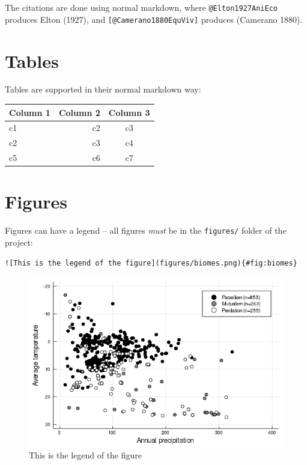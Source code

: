 \documentclass[12pt]{article}
\makeatletter
\def\maxwidth{\ifdim\Gin@nat@width>\linewidth\linewidth
\else\Gin@nat@width\fi}
\let\Oldincludegraphics\includegraphics
\renewcommand{\includegraphics}[1]{\Oldincludegraphics[width=\maxwidth]{#1}}
\makeatother
\begin{document}
The citations are done using normal markdown, where
\texttt{@Elton1927AniEco} produces Elton (1927), and
\texttt{{[}@Camerano1880EquViv{]}} produces (Camerano 1880).

\hypertarget{tables}{%
\section{Tables}\label{tables}}

Tables are supported in their normal markdown way:

\begin{longtable}[]{@{}lrc@{}}
\toprule
Column 1 & Column 2 & Column 3\tabularnewline
\midrule
\endhead
c1 & c2 & c3\tabularnewline
c2 & c3 & c4\tabularnewline
c5 & c6 & c7\tabularnewline
\bottomrule
\end{longtable}

\hypertarget{figures}{%
\section{Figures}\label{figures}}

Figures can have a legend -- all figures \emph{must} be in the
\texttt{figures/} folder of the project:

\begin{verbatim}
![This is the legend of the figure](figures/biomes.png){#fig:biomes}
\end{verbatim}

\begin{figure}
\hypertarget{fig:biomes}{%
\centering
\includegraphics{figures/biomes.png}
\caption{This is the legend of the figure}\label{fig:biomes}
}
\end{figure}
\end{document}
